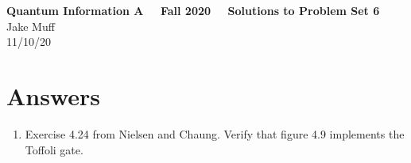 \documentclass[12pt]{article}
\begin{document}
\normalsize

\baselineskip 14pt

\begin{center}
{\Large {\bf Quantum Information A \ \ Fall 2020 \ \  Solutions to Problem Set 6}} \\
Jake Muff \\
11/10/20
\end{center}

\bigskip
\section{Answers}



\begin{enumerate}
    \item Exercise 4.24 from Nielsen and Chaung. Verify that figure 4.9 implements the Toffoli gate.
    \\


\end{enumerate}
\end{document}
